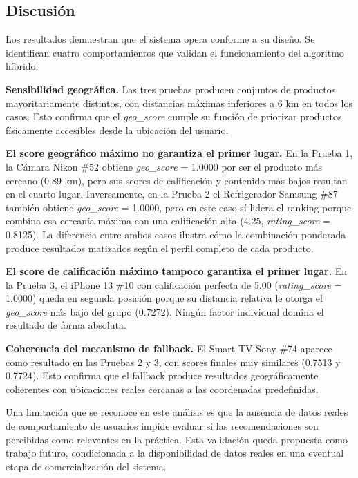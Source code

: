 \documentclass[11pt, letterpaper]{article}
\begin{document}
	\subsection{Discusión}
	
	Los resultados demuestran que el sistema opera conforme a su diseño.
	Se identifican cuatro comportamientos que validan el funcionamiento
	del algoritmo híbrido:
	
	\textbf{Sensibilidad geográfica.} Las tres pruebas producen conjuntos
	de productos mayoritariamente distintos, con distancias máximas
	inferiores a 6 km en todos los casos. Esto confirma que el
	\textit{geo\_score} cumple su función de priorizar productos
	físicamente accesibles desde la ubicación del usuario.
	
	\textbf{El score geográfico máximo no garantiza el primer lugar.}
	En la Prueba 1, la Cámara Nikon \#52 obtiene \textit{geo\_score} =
	1.0000 por ser el producto más cercano (0.89 km), pero sus scores de
	calificación y contenido más bajos resultan en el cuarto lugar.
	Inversamente, en la Prueba 2 el Refrigerador Samsung \#87 también
	obtiene \textit{geo\_score} = 1.0000, pero en este caso sí lidera
	el ranking porque combina esa cercanía máxima con una calificación
	alta (4.25, \textit{rating\_score} = 0.8125). La diferencia entre
	ambos casos ilustra cómo la combinación ponderada produce resultados
	matizados según el perfil completo de cada producto.
	
	\textbf{El score de calificación máximo tampoco garantiza el primer
		lugar.} En la Prueba 3, el iPhone 13 \#10 con calificación perfecta
	de 5.00 (\textit{rating\_score} = 1.0000) queda en segunda posición
	porque su distancia relativa le otorga el \textit{geo\_score} más
	bajo del grupo (0.7272). Ningún factor individual domina el resultado
	de forma absoluta.
	
	\textbf{Coherencia del mecanismo de fallback.} El Smart TV Sony \#74
	aparece como resultado en las Pruebas 2 y 3, con scores finales
	muy similares (0.7513 y 0.7724). Esto confirma que el fallback produce
	resultados geográficamente coherentes con ubicaciones reales cercanas
	a las coordenadas predefinidas.
	
	Una limitación que se reconoce en este análisis es que la ausencia de
	datos reales de comportamiento de usuarios impide evaluar si las
	recomendaciones son percibidas como relevantes en la práctica. Esta
	validación queda propuesta como trabajo futuro, condicionada a la
	disponibilidad de datos reales en una eventual etapa de
	comercialización del sistema.
	
\end{document}
